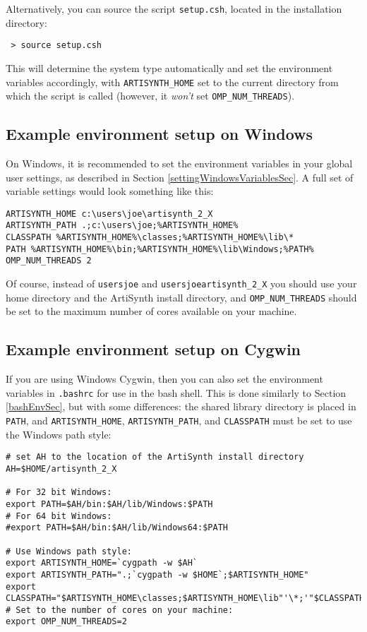 \documentclass{article}
\begin{document}
Alternatively, you can source the script {\tt setup.csh}, located in
the installation directory:

\begin{verbatim}
 > source setup.csh
\end{verbatim}

This will determine the system type automatically and set the
environment variables accordingly, with {\tt ARTISYNTH\_HOME} set to the
current directory from which the script is called (however,
it {\it won't} set {\tt OMP\_NUM\_THREADS}).

\subsection{Example environment setup on Windows}
\label{WindowsEnvironmentSec}

On Windows, it is recommended to set the environment variables in your
global user settings, as described in Section \ref{settingWindowsVariablesSec}. A
full set of variable settings would look something like this:

\begin{lstlisting}
ARTISYNTH_HOME c:\users\joe\artisynth_2_X
ARTISYNTH_PATH .;c:\users\joe;%ARTISYNTH_HOME%
CLASSPATH %ARTISYNTH_HOME%\classes;%ARTISYNTH_HOME%\lib\*
PATH %ARTISYNTH_HOME%\bin;%ARTISYNTH_HOME%\lib\Windows;%PATH%
OMP_NUM_THREADS 2
\end{lstlisting}

Of course, instead of {\tt \BKS users\BKS joe} and {\tt \BKS users\BKS joe\BKS artisynth\_2\_X} you
should use your home directory and the ArtiSynth install directory,
and {\tt OMP\_NUM\_THREADS} should be set to the maximum number of cores
available on your machine.

\subsection{Example environment setup on Cygwin}
\label{CygwinEnvironmentSec}

If you are using Windows Cygwin, then you can also set the environment
variables in {\tt .bashrc} for use in the bash shell.  This is done
similarly to Section \ref{bashEnvSec}, but with some differences: the shared
library directory is placed in {\tt PATH}, and {\tt ARTISYNTH\_HOME},
{\tt ARTISYNTH\_PATH}, and {\tt CLASSPATH} must be set to use the Windows path
style:

\begin{lstlisting}
# set AH to the location of the ArtiSynth install directory
AH=$HOME/artisynth_2_X

# For 32 bit Windows:
export PATH=$AH/bin:$AH/lib/Windows:$PATH
# For 64 bit Windows:
#export PATH=$AH/bin:$AH/lib/Windows64:$PATH

# Use Windows path style:
export ARTISYNTH_HOME=`cygpath -w $AH`
export ARTISYNTH_PATH=".;`cygpath -w $HOME`;$ARTISYNTH_HOME"
export CLASSPATH="$ARTISYNTH_HOME\classes;$ARTISYNTH_HOME\lib"'\*;'"$CLASSPATH"
# Set to the number of cores on your machine:
export OMP_NUM_THREADS=2
\end{lstlisting}
\end{document}
